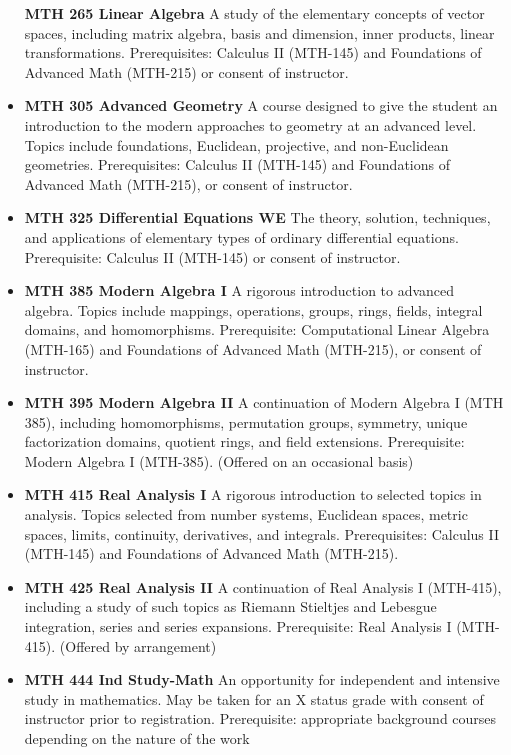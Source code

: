 \documentclass[
  letterpaper,
]{scrbook}
\begin{document}
\begin{itemize}
  \textbf{MTH 265 Linear Algebra} A study of the elementary concepts of
  vector spaces, including matrix algebra, basis and dimension, inner
  products, linear transformations. Prerequisites: Calculus II (MTH-145)
  and Foundations of Advanced Math (MTH-215) or consent of instructor.
\item
  \textbf{MTH 305 Advanced Geometry} A course designed to give the
  student an introduction to the modern approaches to geometry at an
  advanced level. Topics include foundations, Euclidean, projective, and
  non-Euclidean geometries. Prerequisites: Calculus II (MTH-145) and
  Foundations of Advanced Math (MTH-215), or consent of instructor.
\item
  \textbf{MTH 325 Differential Equations WE} The theory, solution,
  techniques, and applications of elementary types of ordinary
  differential equations. Prerequisite: Calculus II (MTH-145) or consent
  of instructor.
\item
  \textbf{MTH 385 Modern Algebra I} A rigorous introduction to advanced
  algebra. Topics include mappings, operations, groups, rings, fields,
  integral domains, and homomorphisms. Prerequisite: Computational
  Linear Algebra (MTH-165) and Foundations of Advanced Math (MTH-215),
  or consent of instructor.
\item
  \textbf{MTH 395 Modern Algebra II} A continuation of Modern Algebra I
  (MTH 385), including homomorphisms, permutation groups, symmetry,
  unique factorization domains, quotient rings, and field extensions.
  Prerequisite: Modern Algebra I (MTH-385). (Offered on an occasional
  basis)
\item
  \textbf{MTH 415 Real Analysis I} A rigorous introduction to selected
  topics in analysis. Topics selected from number systems, Euclidean
  spaces, metric spaces, limits, continuity, derivatives, and integrals.
  Prerequisites: Calculus II (MTH-145) and Foundations of Advanced Math
  (MTH-215).
\item
  \textbf{MTH 425 Real Analysis II} A continuation of Real Analysis I
  (MTH-415), including a study of such topics as Riemann Stieltjes and
  Lebesgue integration, series and series expansions. Prerequisite: Real
  Analysis I (MTH-415). (Offered by arrangement)
\item
  \textbf{MTH 444 Ind Study-Math} An opportunity for independent and
  intensive study in mathematics. May be taken for an X status grade
  with consent of instructor prior to registration. Prerequisite:
  appropriate background courses depending on the nature of the work

\end{itemize}
\end{document}

